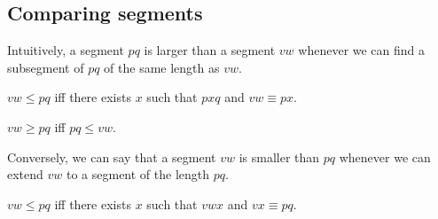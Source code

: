 \documentclass[10pt,a4paper,parskip=half,numbers=endperiod,headings=standardclasses,parskip]{scrbook}
\newcommand{\Cong}[4]{#1 #2 \equiv #3 #4}
\newcommand{\Betw}[3]{#1 #2 #3}
\newcommand{\Leq}[4]{#1 #2 \leq #3 #4}
\newcommand{\Geq}[4]{#1 #2 \geq #3 #4}
\begin{document}
  \subsection{Comparing segments}

  Intuitively, a segment $pq$ is larger than a segment $vw$ whenever we can find a subsegment
  of $pq$ of the same length as $vw$.

  \begin{forthel}
    \begin{definition} %
      $\Leq{v}{w}{p}{q}$ iff there exists $x$ such that $\Betw{p}{x}{q}$ and $\Cong{v}{w}{p}{x}$.
    \end{definition}

    \begin{definition} %
      $\Geq{v}{w}{p}{q}$ iff $\Leq{p}{q}{v}{w}$.
    \end{definition}
  \end{forthel}

  Conversely, we can say that a segment $vw$ is smaller than $pq$ whenever we can extend $vw$
  to a segment of the length $pq$.

    \begin{axiom} %
      $\Leq{v}{w}{p}{q}$ iff there exists $x$ such that $\Betw{v}{w}{x}$ and $\Cong{v}{x}{p}{q}$.
    \end{axiom}
\end{document}
